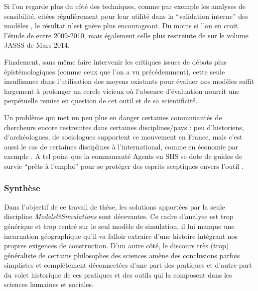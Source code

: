 Si l'on regarde plus du côté des techniques, comme par exemple les analyses de sensibilité, citées régulièrement pour leur utilité dans la \enquote{validation interne} des modèles \autocite{Amblard2006}, le résultat n'est guère plus encourageant. Du moins si l'on en croit l'étude de \textcite{Thiele2014a} entre 2009-2010, mais également celle plus restreinte de \textcite{Cottineau2015} sur le volume JASSS de Mars 2014.

Finalement, sans même faire intervenir les critiques issues de débats plus épistémologiques (comme ceux que l'on a vu précédemment), cette seule insuffisance dans l'utilisation des moyens existants pour évaluer nos modèles suffit largement à prolonger un cercle vicieux où l'absence d'évaluation nourrit une perpétuelle remise en question de cet outil et de sa scientificité.

Un problème qui met un peu plus en danger certaines communautés de chercheurs encore restreintes dans certaines disciplines/pays : peu d'historiens, d'archéologues, de sociologues \autocite{Manzo2007} supportent ce mouvement en France, mais c'est aussi le cas de certaines disciplines à l'international, comme en économie par exemple \autocites{Lehtinen2007, Richiardi2006}[220]{Squazzoni2010}[198]{Fagiolo2007}. A tel point que la communauté Agents en SHS se dote de guides de survie \enquote{prêts à l'emploi} pour se protéger des esprits sceptiques envers l'outil \autocite{Waldherr2013}.

\subsubsection{Synthèse}


Dans l'objectif de ce travail de thèse, les solutions apportées par la seule discipline \textit{Models\&Simulations} sont décevantes. Ce cadre d'analyse est trop générique et trop centré sur le seul modèle de simulation, il lui manque une incarnation géographique qu'il va falloir extraire d'une histoire intégrant nos propres exigences de construction. D'un autre côté, le discours très (trop) généraliste de certains philosophes des sciences amène des conclusions parfois simplistes et complétement déconnectées d'une part des pratiques et d'autre part du volet historique de ces pratiques et des outils qui la composent dans les sciences humaines et sociales.

